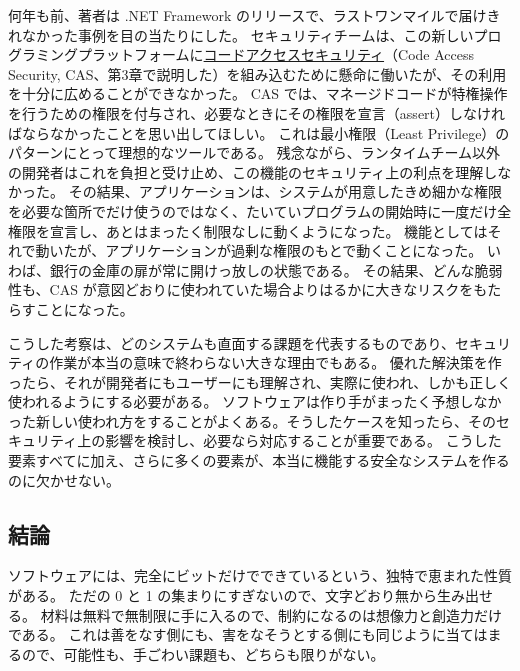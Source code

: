 \documentclass[uplatex]{jsarticle}
\def\label#1{}%
\begin{document}
\begin{exa}\label{exa:ch14-dotnet-cas}
何年も前、著者は .NET Framework のリリースで、ラストワンマイルで届けきれなかった事例を目の当たりにした。
セキュリティチームは、この新しいプログラミングプラットフォームに\underline{コードアクセスセキュリティ}（Code Access Security, CAS、第3章で説明した）を組み込むために懸命に働いたが、その利用を十分に広めることができなかった。
CAS では、マネージドコードが特権操作を行うための権限を付与され、必要なときにその権限を宣言（assert）しなければならなかったことを思い出してほしい。
これは最小権限（Least Privilege）のパターンにとって理想的なツールである。
残念ながら、ランタイムチーム以外の開発者はこれを負担と受け止め、この機能のセキュリティ上の利点を理解しなかった。
その結果、アプリケーションは、システムが用意したきめ細かな権限を必要な箇所でだけ使うのではなく、たいていプログラムの開始時に一度だけ全権限を宣言し、あとはまったく制限なしに動くようになった。
機能としてはそれで動いたが、アプリケーションが過剰な権限のもとで動くことになった。
いわば、銀行の金庫の扉が常に開けっ放しの状態である。
その結果、どんな脆弱性も、CAS が意図どおりに使われていた場合よりはるかに大きなリスクをもたらすことになった。
\end{exa}

こうした考察は、どのシステムも直面する課題を代表するものであり、セキュリティの作業が本当の意味で終わらない大きな理由でもある。
優れた解決策を作ったら、それが開発者にもユーザーにも理解され、実際に使われ、しかも正しく使われるようにする必要がある。
ソフトウェアは作り手がまったく予想しなかった新しい使われ方をすることがよくある。そうしたケースを知ったら、そのセキュリティ上の影響を検討し、必要なら対応することが重要である。
こうした要素すべてに加え、さらに多くの要素が、本当に機能する安全なシステムを作るのに欠かせない。

\subsection{結論}

ソフトウェアには、完全にビットだけでできているという、独特で恵まれた性質がある。
ただの 0 と 1 の集まりにすぎないので、文字どおり無から生み出せる。
材料は無料で無制限に手に入るので、制約になるのは想像力と創造力だけである。
これは善をなす側にも、害をなそうとする側にも同じように当てはまるので、可能性も、手ごわい課題も、どちらも限りがない。
\end{document}
